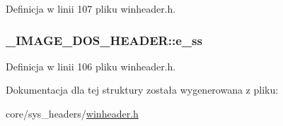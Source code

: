 Definicja w linii 107 pliku winheader.\-h.

\hypertarget{struct___i_m_a_g_e___d_o_s___h_e_a_d_e_r_ae8cba7f40bb926f2218808e7bc2a5965}{
\subsubsection[{e\-\_\-ss}]{ \-\_\-\-I\-M\-A\-G\-E\-\_\-\-D\-O\-S\-\_\-\-H\-E\-A\-D\-E\-R\-::e\-\_\-ss}}\label{struct___i_m_a_g_e___d_o_s___h_e_a_d_e_r_ae8cba7f40bb926f2218808e7bc2a5965}


Definicja w linii 106 pliku winheader.\-h.



Dokumentacja dla tej struktury została wygenerowana z pliku\-:\begin{DoxyCompactItemize}
\item 
core/sys\-\_\-headers/\hyperlink{winheader_8h}{winheader.\-h}\end{DoxyCompactItemize}
